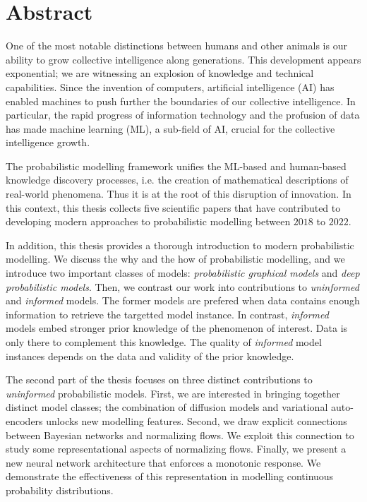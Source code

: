 
\chapter*{Abstract}
One of the most notable distinctions between humans and other animals is our ability to grow collective intelligence along generations. This development appears exponential; we are witnessing an explosion of knowledge and technical capabilities. Since the invention of computers, artificial intelligence (AI) has enabled machines to push further the boundaries of our collective intelligence.
In particular, the rapid progress of information technology and the profusion of data has made machine learning (ML), a sub-field of AI, crucial for the collective intelligence growth.

The probabilistic modelling framework unifies the ML-based and human-based knowledge discovery processes, i.e. the creation of mathematical descriptions of real-world phenomena. Thus it is at the root of this disruption of innovation. In this context, this thesis collects five scientific papers that have contributed to developing modern approaches to probabilistic modelling between $2018$ to $2022$.

In addition, this thesis provides a thorough introduction to modern probabilistic modelling. We discuss the why and the how of probabilistic modelling, and we introduce two important classes of models: \textit{probabilistic graphical models} and \textit{deep probabilistic models}. Then, we contrast our work into contributions to \textit{uninformed} and \textit{informed} models. The former models are prefered when data contains enough information to retrieve the targetted model instance. In contrast, \textit{informed} models embed stronger prior knowledge of the phenomenon of interest. Data is only there to complement this knowledge. The quality of \textit{informed} model instances depends on the data and validity of the prior knowledge.

The second part of the thesis focuses on three distinct contributions to \textit{uninformed} probabilistic models. First, we are interested in bringing together distinct model classes; the combination of diffusion models and variational auto-encoders unlocks new modelling features. Second, we draw explicit connections between Bayesian networks and normalizing flows. We exploit this connection to study some representational aspects of normalizing flows. Finally, we present a new neural network architecture that enforces a monotonic response. We demonstrate the effectiveness of this representation in modelling continuous probability distributions.

